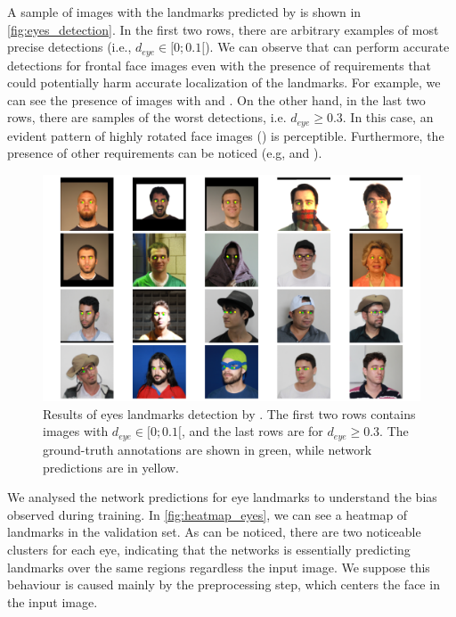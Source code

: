 A sample of images with the landmarks predicted by \methodname is shown in \autoref{fig:eyes_detection}. In the first two rows, there are arbitrary examples of most precise detections (i.e., $d_{eye} \in [0;0.1[$). We can observe that \methodname can perform accurate detections for frontal face images even with the presence of requirements that could potentially harm accurate localization of the landmarks. For example, we can see the presence of images with \framecoveringeyes and \toodarklight. On the other hand, in the last two rows, there are samples of the worst detections, i.e. $d_{eye} \geq 0.3$. In this case, an evident pattern of highly rotated face images (\rollpitchyaw) is perceptible. Furthermore, the presence of other requirements can be noticed (e.g, \blurred and \framestooheavy).

\begin{figure}[tb]
\centering
\includegraphics[width=\linewidth]{images/eyes/detections.pdf}
\caption{Results of eyes landmarks detection by \methodname. The first two rows contains images with $d_{eye} \in [0;0.1[$, and the last rows are for $d_{eye} \geq 0.3$. The ground-truth annotations are shown in green, while network predictions are in yellow.}
\label{fig:eyes_detection}
\end{figure}

We analysed the network predictions for eye landmarks to understand the bias observed during training. In \autoref{fig:heatmap_eyes}, we can see a heatmap of landmarks in the validation set. As can be noticed, there are two noticeable clusters for each eye, indicating that the networks is essentially predicting landmarks over the same regions regardless the input image. We suppose this behaviour is caused mainly by the preprocessing step, which centers the face in the input image.

